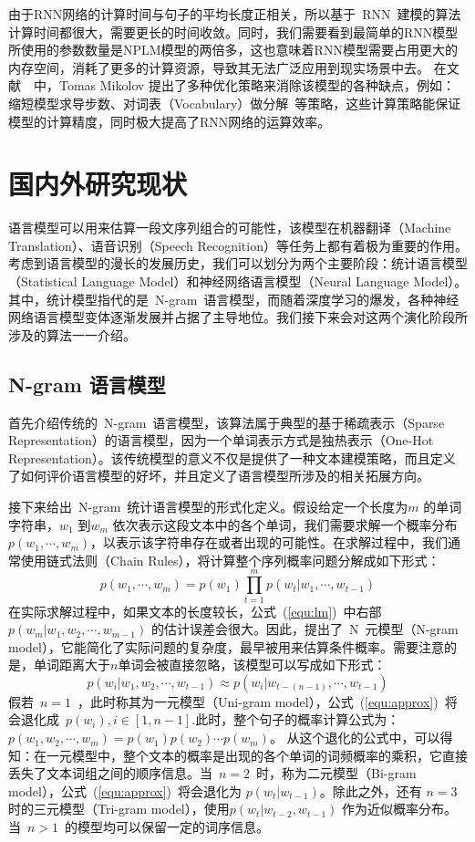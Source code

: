 由于RNN网络的计算时间与句子的平均长度正相关，所以基于~RNN~建模的算法计算时间都很大，需要更长的时间收敛。同时，我们需要看到最简单的RNN模型所使用的参数数量是NPLM模型的两倍多，这也意味着RNN模型需要占用更大的内存空间，消耗了更多的计算资源，导致其无法广泛应用到现实场景中去。
在文献~\cite{DBLP:conf/icassp/MikolovKBCK11}~中，Tomas Mikolov 提出了多种优化策略来消除该模型的各种缺点，例如：缩短模型求导步数、对词表（Vocabulary）做分解~等策略，这些计算策略能保证模型的计算精度，同时极大提高了RNN网络的运算效率。

\section{国内外研究现状}
语言模型可以用来估算一段文序列组合的可能性，该模型在机器翻译（Machine Translation）、语音识别（Speech Recognition）等任务上都有着极为重要的作用。考虑到语言模型的漫长的发展历史，我们可以划分为两个主要阶段：统计语言模型（Statistical Language Model）和神经网络语言模型（Neural Language Model）。
其中，统计模型指代的是~N-gram~语言模型，而随着深度学习的爆发，各种神经网络语言模型变体逐渐发展并占据了主导地位。我们接下来会对这两个演化阶段所涉及的算法一一介绍。

\subsection{N-gram 语言模型}
首先介绍传统的~N-gram~语言模型，该算法属于典型的基于稀疏表示（Sparse Representation）的语言模型，因为一个单词表示方式是独热表示（One-Hot Representation）。该传统模型的意义不仅是提供了一种文本建模策略，而且定义了如何评价语言模型的好坏，并且定义了语言模型所涉及的相关拓展方向。

接下来给出~N-gram~统计语言模型的形式化定义。假设给定一个长度为$m$ 的单词字符串，$w_1$ 到$w_m$ 依次表示这段文本中的各个单词，我们需要求解一个概率分布$p(w_1,\cdots,w_m)$，以表示该字符串存在或者出现的可能性。在求解过程中，我们通常使用链式法则（Chain Rules），将计算整个序列概率问题分解成如下形式：
\begin{equation}
\label{equ:lm}
p(w_1,\cdots,w_m) =p(w_1)\prod_{t=1}^{m}p(w_t|w_1,\cdots,w_{t-1})
\end{equation}
在实际求解过程中，如果文本的长度较长，公式~(\ref{equ:lm})~中右部~$p(w_m | w_1,w_2,\cdots,w_{m-1}) $ 的估计误差会很大。因此，提出了~N~元模型（N-gram model），它能简化了实际问题的复杂度，最早被用来估算条件概率。需要注意的是，单词距离大于$n$单词会被直接忽略，该模型可以写成如下形式：
\begin{equation}
\label{equ:approx}
p(w_i | w_1,w_2,\cdots,w_{t-1})  \approx p(w_i | w_{t-(n-1)},\cdots,w_{t-1})
\end{equation}
假若~$n=1$~，此时称其为一元模型（Uni-gram model），公式~(\ref{equ:approx})~将会退化成~$p(w_i),i\in [1,n-1]$.此时，整个句子的概率计算公式为：~$p(w_1,w_2,\cdots,w_m) = p(w_1)p(w_2) \cdots p(w_m)$。
从这个退化的公式中，可以得知：在一元模型中，整个文本的概率是出现的各个单词的词频概率的乘积，它直接丢失了文本词组之间的顺序信息。当~$n = 2$~时，称为二元模型（Bi-gram model），公式~(\ref{equ:approx})~将会退化为 $p(w_t|w_{t-1})$。除此之外，还有 $n=3$ 时的三元模型（Tri-gram model），使用$p(w_t |w_{t-2},w_{t-1})$ 作为近似概率分布。当~$n>1$~的模型均可以保留一定的词序信息。

